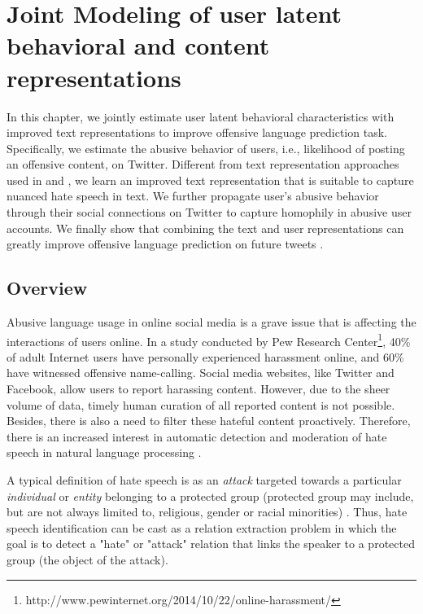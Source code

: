 \chapter{Joint Modeling of user latent behavioral and content representations}
\label{chap:syntactic}
In this chapter, we jointly estimate user latent behavioral characteristics with improved text representations to improve offensive language prediction task.
Specifically, we estimate the abusive behavior of users, i.e., likelihood of posting an offensive content, on Twitter. Different from text representation approaches used in  and , we learn an improved text representation that is suitable to capture nuanced hate speech in text.
We further propagate user's abusive behavior through their social connections on Twitter to capture homophily in abusive user accounts. We finally show that combining the text and user representations can greatly improve offensive language prediction on future tweets \cite{hate}.

\section{Overview}
Abusive language usage in online social media is a grave issue that is affecting the interactions of users online. In a study conducted by Pew Research Center\footnote{http://www.pewinternet.org/2014/10/22/online-harassment/}, 40\% of adult Internet users have personally experienced harassment online, and 60\% have witnessed offensive name-calling. Social media websites, like Twitter and Facebook, allow users to report harassing content. However, due to the sheer volume of data, timely human curation of all reported content is not possible. Besides, there is also a need to filter these hateful content proactively. Therefore, there is an increased interest in automatic detection and moderation of hate speech in natural language processing \cite{waseem-hovy-2016}.

A typical definition of hate speech is as an \emph{attack} targeted towards a particular \emph{individual} or \emph{entity} belonging to
a protected group (protected group may include, but are not always limited to, religious, gender or racial minorities) \cite{elsherief2018hate}. Thus, hate speech identification can be cast as a relation extraction problem in which
the goal is to detect a "hate" or "attack" relation that links the speaker to a protected group (the object of the attack).

